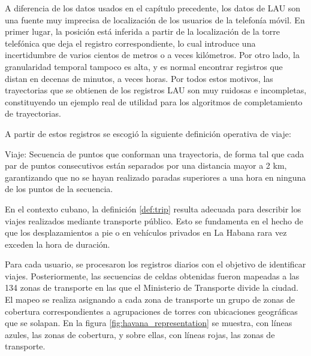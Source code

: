 A diferencia de los datos usados en el cap\'itulo precedente, los datos de LAU son una fuente muy imprecisa de localizaci\'on de los usuarios de la telefon\'ia m\'ovil. En primer lugar, la posici\'on est\'a inferida a partir de la localizaci\'on de la torre telef\'onica que deja el registro correspondiente, lo cual introduce una incertidumbre de varios cientos de metros o a veces kil\'ometros. Por otro lado, la granularidad temporal tampoco es alta, y es normal encontrar registros que distan en decenas de minutos, a veces horas. Por todos estos motivos, las trayectorias que se obtienen de los registros LAU son muy ruidosas e incompletas, constituyendo un ejemplo real de utilidad para los algoritmos de completamiento de trayectorias.

A partir de estos registros se escogi\'o la siguiente definici\'on operativa de viaje:

\begin{definition}{Viaje:} Secuencia de puntos que conforman una trayectoria, de forma tal que cada par de puntos consecutivos están separados por una distancia mayor a 2 km, garantizando que no se hayan realizado paradas superiores a una hora en ninguna de los puntos de la secuencia.
\label{def:trip} \end{definition}

En el contexto cubano, la definición \ref{def:trip} resulta adecuada para describir los viajes realizados mediante transporte público. Esto se fundamenta en el hecho de que los desplazamientos a pie o en vehículos privados en La Habana rara vez exceden la hora de duración.

Para cada usuario, se procesaron los registros diarios con el objetivo de identificar viajes. Posteriormente, las secuencias de celdas obtenidas fueron mapeadas a las 134 zonas de transporte en las que el Ministerio de Transporte divide la ciudad. El mapeo se realiza asignando a cada zona de transporte un grupo de zonas de cobertura correspondientes a agrupaciones de torres con ubicaciones geográficas que se solapan. En la figura \ref{fig:havana_representation} se muestra, con líneas azules, las zonas de cobertura, y sobre ellas, con líneas rojas, las zonas de transporte.

